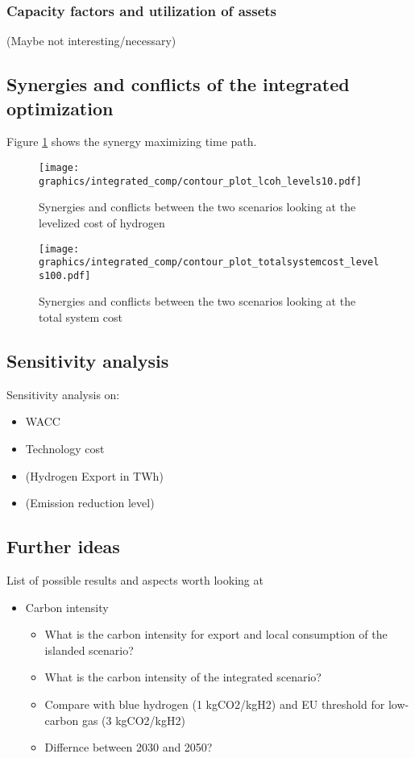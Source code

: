 \subsubsection{Capacity factors and utilization of assets}
(Maybe not interesting/necessary)



\subsection{Synergies and conflicts of the integrated optimization}
\label{subsec: syn_conf_integrated}
Figure \ref{fig:contour_plot} shows the synergy maximizing time path.

\begin{figure}[h!]
    \centering
    \texttt{[image: graphics/integrated\_comp/contour\_plot\_lcoh\_levels10.pdf]}
    \caption{Synergies and conflicts between the two scenarios looking at the levelized cost of hydrogen}
    \label{fig:contour_plot}
\end{figure}

\begin{figure}[h!]
    \centering
    \texttt{[image: graphics/integrated\_comp/contour\_plot\_totalsystemcost\_levels100.pdf]}
    \caption{Synergies and conflicts between the two scenarios looking at the total system cost}
    \label{fig:contour_plot_totalsystem}
\end{figure}



\subsection{Sensitivity analysis}
Sensitivity analysis on:
\begin{itemize}
    \item WACC
    \item Technology cost
    \item (Hydrogen Export in TWh)
    \item (Emission reduction level)
\end{itemize}


\subsection{Further ideas}
List of possible results and aspects worth looking at
\begin{itemize}
    \item Carbon intensity
    \begin{itemize}
        \item What is the carbon intensity for export and local consumption of the islanded scenario? 
        \item What is the carbon intensity of the integrated scenario?
        \item Compare with blue hydrogen (1 kgCO2/kgH2) and EU threshold for low-carbon gas (3 kgCO2/kgH2)
        \item Differnce between 2030 and 2050?
    \end{itemize}
\end{itemize}

